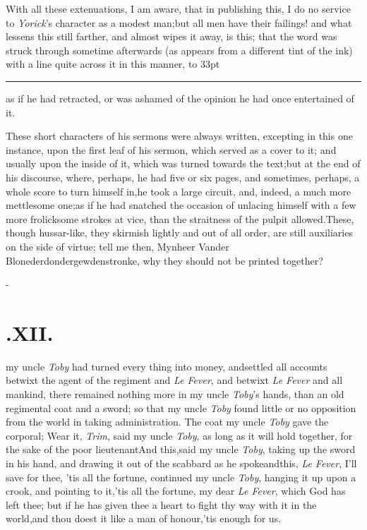 \documentclass{article}
\begin{document}
With all these extenuations, I am aware, that in publishing
this, I do no service to \textit{Yorick}’s character as a
modest man;\tsk but all men have their failings! and what lessens
this still farther, and almost wipes it away, is this; that the
word was struck through sometime afterwards (as appears from a
different tint of the ink) with a line quite across it in this manner,
\hbox to 33pt{\leaders\hrule width 1pt height 3.4pt depth -3.1pt\hfill}\tsh as if he had retracted, or was
ashamed of the opinion he had once entertained of it.

These short characters of his sermons were always written,
excepting in this one instance, upon the first leaf of his sermon,
which served as a cover to it; and usually upon the inside of it,
which was turned towards the text;\tsk but at the end of his
discourse, where, perhaps, he had five or six pages, and sometimes,
perhaps, a whole score to turn himself in,\tsk he took a large
circuit, and, indeed, a much more mettlesome one;\tsk as if he
had snatched the occasion of unlacing himself with a few more
frolicksome strokes at vice, than the straitness of the pulpit
allowed.\tsk These, though hussar-like, they skirmish lightly and
out of all order, are still auxiliaries on the side of
virtue\tsk; tell me then, Mynheer Vander
Blonederdondergewdenstronke, why they should not be printed
together?

\vfill{}\eject
\null\kern-\baselineskip
\section{.\enspace XII.}

 my uncle \textit{Toby} had turned
every thing into money, and\break settled all accounts betwixt the agent
of the regiment and \textit{Le Fever}, and betwixt \textit{Le Fever}
and all mankind,\tsh\break
there remained nothing more in my uncle \textit{Toby}’s hands, than an old
regimental coat and a sword; so that my uncle \textit{Toby} found little or no
opposition from the world in taking administration. The coat my uncle \textit{Toby}
gave the corporal;\break
\tsh Wear it, \textit{Trim}, said my uncle \textit{Toby}, as long
as it will hold together, for the sake of the poor lieutenant\tsh And this,\tsh said
my uncle \textit{Toby}, taking up the sword in his hand, and drawing it out of the
scabbard as he spoke\tsk and\break this, \textit{Le Fever}, I’ll save for thee,\tsk
’tis all the fortune, continued my uncle \textit{Toby}, hanging it up upon a
crook, and pointing to it,\tsk ’tis all the fortune, my dear \textit{Le Fever},
which God has left thee;\break
but if he has given thee a heart to fight thy way with it
in the world,\tsk and thou doest it like a man of honour,\tsk ’tis enough for us.
\end{document}
